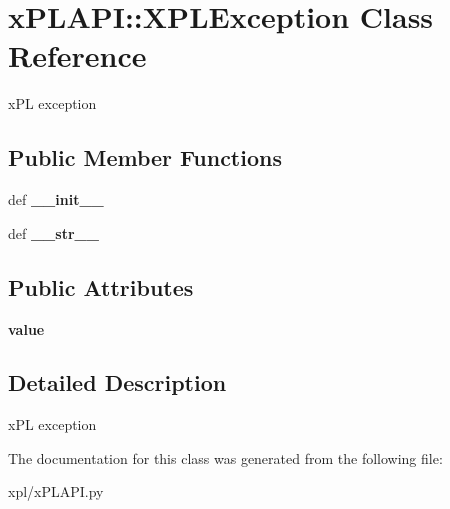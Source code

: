 \hypertarget{classxPLAPI_1_1XPLException}{
\section{xPLAPI::XPLException Class Reference}
\label{classxPLAPI_1_1XPLException}
}
xPL exception  


\subsection*{Public Member Functions}
\begin{CompactItemize}
\item 
\hypertarget{classxPLAPI_1_1XPLException_fa97cb40136ea6f52c5b9ce792435e75}{
def \textbf{\_\-\_\-init\_\-\_\-}}
\label{classxPLAPI_1_1XPLException_fa97cb40136ea6f52c5b9ce792435e75}

\item 
\hypertarget{classxPLAPI_1_1XPLException_2713888a5319bbbeb96a991547dd127b}{
def \textbf{\_\-\_\-str\_\-\_\-}}
\label{classxPLAPI_1_1XPLException_2713888a5319bbbeb96a991547dd127b}

\end{CompactItemize}
\subsection*{Public Attributes}
\begin{CompactItemize}
\item 
\hypertarget{classxPLAPI_1_1XPLException_a426e1d994b5f51ef4249260b8357de7}{
\textbf{value}}
\label{classxPLAPI_1_1XPLException_a426e1d994b5f51ef4249260b8357de7}

\end{CompactItemize}


\subsection{Detailed Description}
xPL exception 

The documentation for this class was generated from the following file:\begin{CompactItemize}
\item 
xpl/xPLAPI.py\end{CompactItemize}
